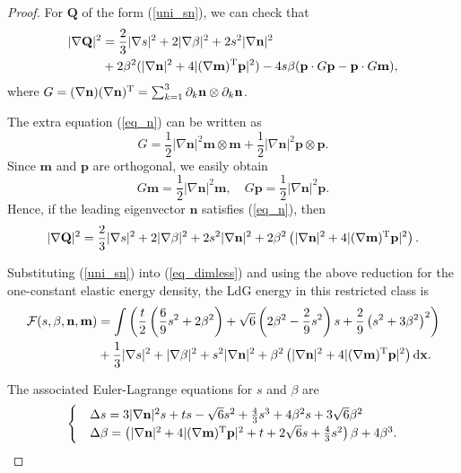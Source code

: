 \documentclass[10pt, a4paper]{article}
\newcommand\dd{\mathrm{d}}
\newcommand\n{\mathbf{n}}
\newcommand\m{\mathbf{m}}
\newcommand\p{\mathbf{p}}
\newcommand\x{\mathbf{x}}
\newcommand\Qvec{\mathbf{Q}}
\newcommand\pp{\partial}
\begin{document}
\begin{proof}

For $\Qvec$ of the form (\ref{uni_sn}), we can check that
\begin{equation}
\begin{aligned}
|\nabla \Qvec|^2 & = \frac{2}{3}|\nabla s|^2 + 2 |\nabla \beta|^2 + 2 s^2 |\nabla \n|^2 \\
            & + 2 \beta^2 (|\nabla \n|^2 + 4 |(\nabla \m)^{\rm T} \p|^2) - 4 s \beta(\p \cdot G \p - \p \cdot G \m), \\
\end{aligned}
\end{equation}
where $G = (\nabla \n)(\nabla \n)^{\rm T} = \sum_{k = 1}^3 \pp_k \n \otimes \pp_k \n$.

The extra equation (\ref{eq_n}) can be written as
\begin{equation}
G = \frac{1}{2} |\nabla \n|^2 \m \otimes \m + \frac{1}{2} |\nabla \n|^2 \p \otimes \p.
\end{equation}
Since $\m$ and $\p$ are orthogonal, we easily obtain
\begin{equation}
G \m = \frac{1}{2} |\nabla \n|^2 \m, \quad G \p = \frac{1}{2} |\nabla \n|^2 \p.
\end{equation}
Hence, if the leading eigenvector $\n$ satisfies (\ref{eq_n}), then
\begin{equation}
|\nabla \Qvec|^2  = \frac{2}{3}|\nabla s|^2 + 2 |\nabla \beta|^2 + 2 s^2 |\nabla \n|^2 + 2 \beta^2 \left( |\nabla \n|^2 + 4 |(\nabla \m)^{\rm T} \p|^2 \right).
\end{equation}


Substituting  (\ref{uni_sn}) into (\ref{eq_dimless}) and using the above reduction for the one-constant elastic energy density, the LdG energy in this restricted class is
\begin{equation}\label{fun_snb}
\begin{aligned}
  \mathcal{F}(s, \beta, \n , \m) & = \int \left( \frac{t}{2} \left( \frac{6}{9} s^2 + 2 \beta^2 \right) + \sqrt{6} \left( 2 \beta^2 - \frac{2}{9} s^2 \right) s + \frac{2}{9} \left( s^2 + 3 \beta^2 \right)^2 \right) \\
                               & + \frac{1}{3}|\nabla s|^2 + |\nabla \beta|^2 + s^2 |\nabla \n|^2 + \beta^2 \left( |\nabla \n|^2 + 4 |(\nabla \m)^{\rm T} \p|^2 \right) \dd \x. \\
\end{aligned}
\end{equation}

The associated Euler-Lagrange equations for $s$ and $\beta$ are
\begin{equation}
\begin{cases}
& \Delta s = 3 |\nabla \n|^2 s + ts - \sqrt{6} s^2 + \frac{4}{3}s^3 + 4 \beta^2 s + 3 \sqrt{6} \beta^2 \\
& \Delta \beta = \left( |\nabla \n|^2 + 4 |(\nabla \m)^{\rm T} \p|^2 + t + 2\sqrt{6} s + \frac{4}{3}s^2 \right) \beta +  4 \beta^3. \\
\end{cases}
\end{equation}


\end{proof}
\end{document}
